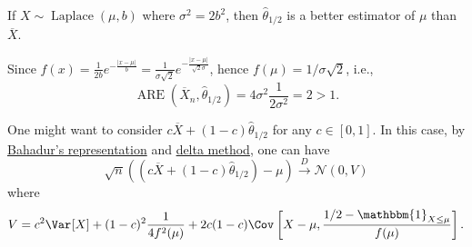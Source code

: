 \begin{eg}
	If \(X \sim \operatorname{Laplace}(\mu , b) \) where \(\sigma ^2 = 2b^2\), then \(\hat{\theta} _{1 / 2}\) is a better estimator of \(\mu \) than \(\overline{X} \).
\end{eg}
\begin{explanation}
	Since \(f(x) = \frac{1}{2b} e^{- \frac{\vert x - \mu \vert }{b}} = \frac{1}{\sigma \sqrt{2} } e^{- \frac{\vert x - \mu \vert }{\sqrt{2} \sigma }}\), hence \(f(\mu ) = 1 / \sigma \sqrt{2} \), i.e.,
	\[
		\operatorname{ARE}(\overline{X} _n, \hat{\theta} _{1 / 2})
		= 4 \sigma ^2 \frac{1}{2 \sigma ^2}
		= 2 > 1.
	\]
\end{explanation}

One might want to consider \(c \overline{X} + (1 - c)\hat{\theta} _{1 / 2}\) for any \(c \in [0, 1]\). In this case, by \hyperref[thm:Bahadur-representation]{Bahadur's representation} and \hyperref[thm:delta-method]{delta method}, one can have
\[
	\sqrt{n} \left( (c \overline{X} + (1 - c)\hat{\theta} _{1 / 2}) - \mu \right) \overset{D}{\to} \mathcal{N} (0, V)
\]
where
\[
	V = c^2 \Var_{}[X] + (1 - c)^2 \frac{1}{4 f^2(\mu )} + 2c(1 - c) \Cov_{}\left[X - \mu , \frac{1 / 2 - \mathbbm{1}_{X \leq \mu } }{f(\mu )}\right].
\]